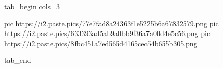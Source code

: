  
 
 
 
 

\ifcmt
  tab_begin cols=3

     pic https://i2.paste.pics/77e7fad8a24363f1e5225b6a67832579.png
		 pic https://i2.paste.pics/633393ad5ab9a0bb9f36a7a00d4e5c56.png
		 pic https://i2.paste.pics/8fbc451a7ed565d4165cec54b655b305.png

  tab_end
\fi
